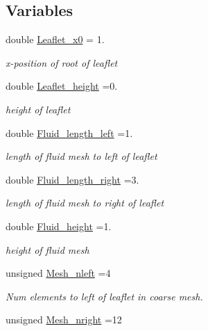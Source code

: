 \subsection*{Variables}
\begin{DoxyCompactItemize}
\item 
double \hyperlink{namespaceGlobal__Parameters_a84d27a1abb5d90476de43a9920dc347f}{Leaflet\+\_\+x0} = 1.
\begin{DoxyCompactList}\small\item\em x-\/position of root of leaflet \end{DoxyCompactList}\item 
double \hyperlink{namespaceGlobal__Parameters_a58c392f43a98de12e513c4bc50169fa6}{Leaflet\+\_\+height} =0.
\begin{DoxyCompactList}\small\item\em height of leaflet \end{DoxyCompactList}\item 
double \hyperlink{namespaceGlobal__Parameters_aced7b712f2e8390ceef273157690001b}{Fluid\+\_\+length\+\_\+left} =1.
\begin{DoxyCompactList}\small\item\em length of fluid mesh to left of leaflet \end{DoxyCompactList}\item 
double \hyperlink{namespaceGlobal__Parameters_a0a2d2dfd5a51de4b4fcd3937c029010f}{Fluid\+\_\+length\+\_\+right} =3.
\begin{DoxyCompactList}\small\item\em length of fluid mesh to right of leaflet \end{DoxyCompactList}\item 
double \hyperlink{namespaceGlobal__Parameters_ae1aaf6e9438d5ff7715fe6ceaeaf4fbc}{Fluid\+\_\+height} =1.
\begin{DoxyCompactList}\small\item\em height of fluid mesh \end{DoxyCompactList}\item 
unsigned \hyperlink{namespaceGlobal__Parameters_a899325ce0b7ede8237bd52d8f0fd44e2}{Mesh\+\_\+nleft} =4
\begin{DoxyCompactList}\small\item\em Num elements to left of leaflet in coarse mesh. \end{DoxyCompactList}\item 
unsigned \hyperlink{namespaceGlobal__Parameters_a83ca6bb6240a3f5ef2199a8646607dcf}{Mesh\+\_\+nright} =12

\end{DoxyCompactItemize}
